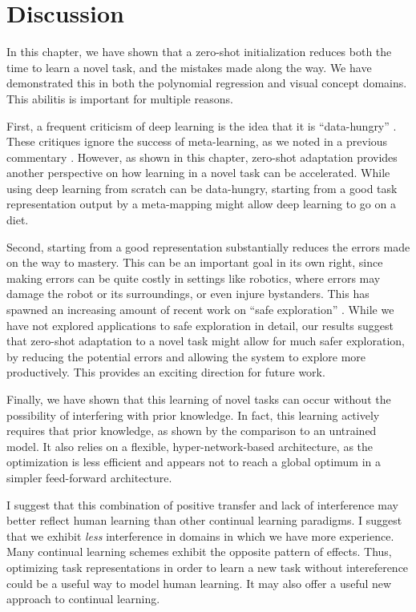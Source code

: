 \section{Discussion}
In this chapter, we have shown that a zero-shot initialization reduces both the time to learn a novel task, and the mistakes made along the way. We have demonstrated this in both the polynomial regression and visual concept domains. This abilitis is important for multiple reasons. \par 
First, a frequent criticism of deep learning is the idea that it is ``data-hungry'' \citep[e.g.]{Lake2016, Marcus2018}. These critiques ignore the success of meta-learning, as we noted in a previous commentary \citep{Hansen2017}. However, as shown in this chapter, zero-shot adaptation provides another perspective on how learning in a novel task can be accelerated. While using deep learning from scratch can be data-hungry, starting from a good task representation output by a meta-mapping might allow deep learning to go on a diet. \par  
Second, starting from a good representation substantially reduces the errors made on the way to mastery. This can be an important goal in its own right, since making errors can be quite costly in settings like robotics, where errors may damage the robot or its surroundings, or even injure bystanders. This has spawned an increasing amount of recent work on ``safe exploration'' \citep[e.g.][]{Turchetta2016, Turchetta2019}. While we have not explored applications to safe exploration in detail, our results suggest that zero-shot adaptation to a novel task might allow for much safer exploration, by reducing the potential errors and allowing the system to explore more productively. This provides an exciting direction for future work. \par  
Finally, we have shown that this learning of novel tasks can occur without the possibility of interfering with prior knowledge. In fact, this learning actively requires that prior knowledge, as shown by the comparison to an untrained model. It also relies on a flexible, hyper-network-based architecture, as the optimization is less efficient and appears not to reach a global optimum in a simpler feed-forward architecture.\par 
I suggest that this combination of positive transfer and lack of interference may better reflect human learning than other continual learning paradigms. I suggest that we exhibit \emph{less} interference in domains in which we have more experience. Many continual learning schemes exhibit the opposite pattern of effects. Thus, optimizing task representations in order to learn a new task without intereference could be a useful way to model human learning. It may also offer a useful new approach to continual learning.\par 
